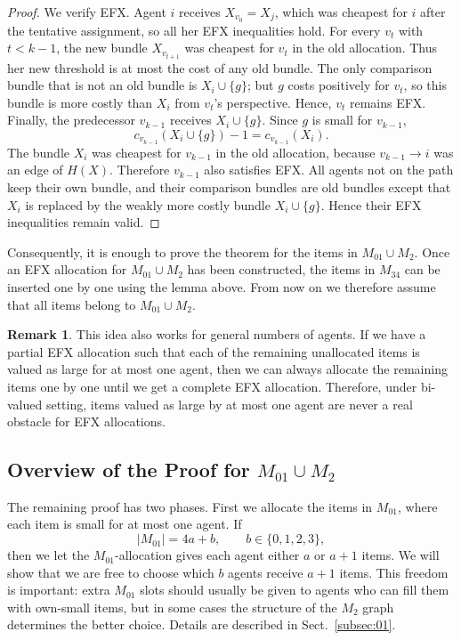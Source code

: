\documentclass{article}
\theoremstyle{definition}
\newtheorem{remark}{Remark}
\begin{document}
\begin{proof}
We verify EFX.  Agent $i$ receives $X_{v_0}=X_j$, which was cheapest for
$i$ after the tentative assignment, so all her EFX inequalities hold.
For every $v_t$ with $t<k-1$, the new bundle $X_{v_{t+1}}$ was cheapest for
$v_t$ in the old allocation.  Thus her new threshold is at most the cost of
any old bundle.  The only comparison bundle that is not an old bundle is
$X_i\cup\{g\}$; but $g$ costs positively for $v_t$, so this bundle is more costly than $X_i$ from $v_t$'s perspective.
Hence, $v_t$ remains EFX.
Finally, the predecessor $v_{k-1}$ receives $X_i\cup\{g\}$.  Since $g$ is
small for $v_{k-1}$,
\[
 c_{v_{k-1}}(X_i\cup\{g\})-1=c_{v_{k-1}}(X_i).
\]
The bundle $X_i$ was cheapest for $v_{k-1}$ in the old allocation, because
$v_{k-1}\to i$ was an edge of $H(X)$.  Therefore $v_{k-1}$ also satisfies
EFX.
All agents not on the path keep their own bundle, and their comparison
bundles are old bundles except that $X_i$ is replaced by the weakly more
costly bundle $X_i\cup\{g\}$.
Hence their EFX inequalities remain valid.
\end{proof}

Consequently, it is enough to prove the theorem for the items in
$M_{01}\cup M_2$.  Once an EFX allocation for $M_{01}\cup M_2$ has been
constructed, the items in $M_{34}$ can be inserted one by one using the
lemma above.  From now on we therefore assume that all items belong to
$M_{01}\cup M_2$.

\begin{remark}
    This idea also works for general numbers of agents.
    If we have a partial EFX allocation such that each of the remaining unallocated items is valued as large for at most one agent, then we can always allocate the remaining items one by one until we get a complete EFX allocation.
    Therefore, under bi-valued setting, items valued as large by at most one agent are never a real obstacle for EFX allocations.
\end{remark}

\subsection{Overview of the Proof for $M_{01}\cup M_2$}
\label{subsec:012over}
The remaining proof has two phases.  First we allocate the items in
$M_{01}$, where each item is small for at most one agent.  If
\[
 |M_{01}|=4a+b,
 \qquad b\in\{0,1,2,3\},
\]
then we let the $M_{01}$-allocation gives each agent either $a$ or $a+1$ items.  We will show that we
are free to choose which $b$ agents receive $a+1$ items.  This freedom is
important: extra $M_{01}$ slots should usually be given to agents who can
fill them with own-small items, but in some cases the structure of the
$M_2$ graph determines the better choice.
Details are described in Sect.~\ref{subsec:01}.
\end{document}
